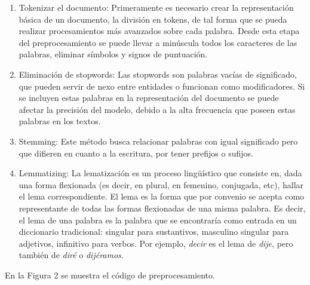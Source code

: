 \documentclass[a4paper,10pt,twocolumn]{article}
\begin{document}
        \begin{enumerate}
                \item Tokenizar el documento: Primeramente es necesario crear la representación básica de un documento, la división en tokens, de tal forma que se pueda realizar procesamientos más avanzados sobre cada palabra. Desde esta etapa del preprocesamiento se puede llevar a minúscula todos los caracteres de las palabras, eliminar símbolos y signos de puntuación.
                
                \item Eliminación de stopwords: Las stopwords son palabras vacías de significado, que pueden servir de nexo entre entidades o funcionan como modificadores. Si se incluyen estas palabras en la representación del documento se puede afectar la precisión del modelo, debido a la alta frecuencia que poseen estas palabras en los textos.

                \item Stemming: Este método busca relacionar palabras con igual significado pero que difieren en cuanto a la escritura, por tener prefijos o sufijos. 

                \item Lemmatizing: La lematización es un proceso lingüístico que consiste en, dada una forma flexionada (es decir, en plural, en femenino, conjugada, etc), hallar el lema correspondiente. El lema es la forma que por convenio se acepta como representante de todas las formas flexionadas de una misma palabra. Es decir, el lema de una palabra es la palabra que se encontraría como entrada en un diccionario tradicional: singular para sustantivos, masculino singular para adjetivos, infinitivo para verbos. Por ejemplo, \emph{decir} es el lema de \emph{dije}, pero también de \emph{diré} o \emph{dijéramos}.
                
    	\end{enumerate}


        En la Figura 2 se muestra el código de preprocesamiento.

\end{document}
